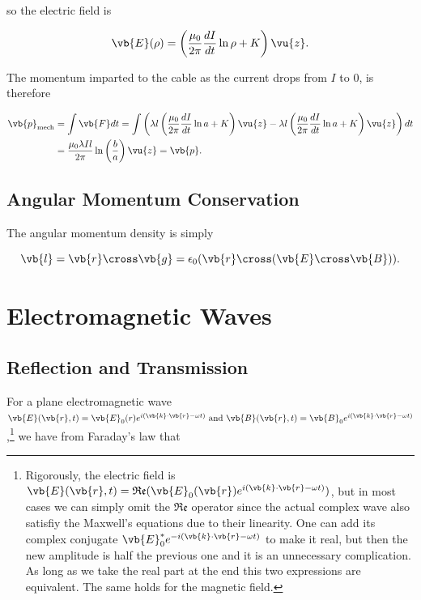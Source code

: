 \documentclass[english,a4paper,12pt]{report}
\begin{document}
{so the electric field is 

\begin{equation}
    \vb{E} (\rho ) = \left( \frac{\mu_0 }{2\pi } \frac{dI}{dt} \ln \rho +K  \right) \vu{z}.
\end{equation}

The momentum imparted to the cable as the current drops from \(I\) to 0, is therefore

\begin{equation}
    \begin{aligned} 
    \vb{p}_{\text{mech} }  &= \int \vb{F} dt = \int \left(\lambda l \left( \frac{\mu_0 }{2\pi } \frac{dI}{dt} \ln a + K  \right)\vu{z} - \lambda l \left( \frac{\mu_0 }{2\pi } \frac{dI}{dt} \ln a + K  \right)\vu{z}\right) dt \\ 
    &= \frac{\mu_0 \lambda Il}{2\pi } \ln \left( \frac{b}{a}  \right)\vu{z} = \vb{p} .
    \end{aligned} 
\end{equation}

} 



\section{Angular Momentum Conservation}

The angular momentum density is simply 

\begin{equation}
    \vb{l} = \vb{r} \cross \vb{g} = \epsilon_0 (\vb{r} \cross (\vb{E} \cross \vb{B} )).
\end{equation}

\chapter{Electromagnetic Waves}

\section{Reflection and Transmission}

For a plane electromagnetic wave \(\vb{E} (\vb{r} ,t) = \vb{E} _{0}(r)e^{i (\vb{k} \cdot \vb{r} -\omega t)} \text { and } \vb{B} (\vb{r} ,t) = \vb{B} _{0}e^{i(\vb{k} \cdot \vb{r} -\omega t)}\),\footnote{Rigorously, the electric field is \(\vb{E} (\vb{r} ,t) = \mathfrak{Re} (\vb{E} _{0}(\vb{r} ) e^{i(\vb{k} \cdot \vb{r} -\omega t)}  ) \), but in most cases we can simply omit the \(\mathfrak{Re} \) operator since the actual complex wave also satisfiy the Maxwell's equations due to their linearity. One can add its complex conjugate \(\vb{E} _{0}^* e^{-i(\vb{k} \cdot \vb{r} -\omega t)}  \) to make it real, but then the new amplitude is half the previous one and it is an unnecessary complication. As long as we take the real part at the end this two expressions are equivalent. The same holds for the magnetic field.} we have from Faraday's law that 
\end{document}
